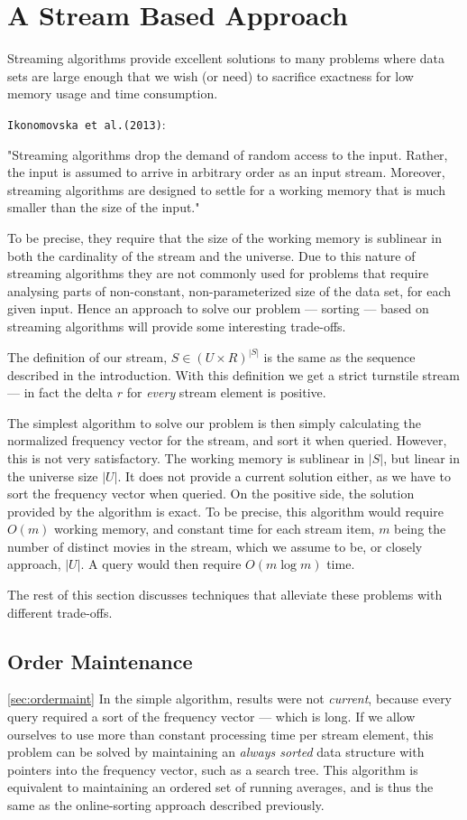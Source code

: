 \section{A Stream Based Approach}
Streaming algorithms provide excellent solutions to many problems where data
sets are large enough that we wish (or need) to sacrifice exactness for low
memory usage and time consumption.

\texttt{Ikonomovska et al.(2013)}\citep{ikonomovskazelke}:

"Streaming algorithms drop the demand of random access to the input. Rather, the input
is assumed to arrive in arbitrary order as an input stream. Moreover, streaming algorithms
are designed to settle for a working memory that is much smaller than the size
of the input."

To be precise, they require that the size of the working memory is sublinear in both the cardinality of the stream and the universe.
Due to this nature of streaming algorithms they are not commonly used for
problems that require analysing parts of non-constant, non-parameterized size
of the data set, for each given input. Hence an approach to
solve our problem --- sorting --- based on streaming algorithms will provide some interesting
trade-offs.

The definition of our stream, $S \in (U\times R)^{|S|}$ is the same as the
sequence described in the introduction. With this definition we get a strict
turnstile stream --- in fact the delta $r$ for \textit{every} stream element is
positive.

The simplest algorithm to solve our problem is then simply calculating the
normalized frequency vector for the stream, and sort it when queried.
However, this is not very satisfactory. The working memory is
sublinear in $|S|$, but linear in the universe size $|U|$. It
does not provide a current solution either, as we have to sort the frequency
vector when queried. On the positive side, the solution provided by the
algorithm is exact. To be precise, this algorithm would require $O(m)$ working
memory, and constant time for each stream item, $m$ being the number of distinct movies
in the stream, which we assume to be, or closely approach, $|U|$. A query would then
require $O(m \log m)$ time.

The rest of this section discusses techniques that alleviate these problems
with different trade-offs.

\subsection{Order Maintenance}
\ref{sec:ordermaint}
In the simple algorithm, results were not \textit{current}, because every query
required a sort of the frequency vector --- which is long. If we allow ourselves
to use more than constant processing time per stream element, this problem can
be solved by maintaining an \textit{always sorted} data structure with pointers
into the frequency vector, such as a search tree.
This algorithm is equivalent to maintaining an ordered set of running averages,
and is thus the same as the online-sorting approach described previously.


